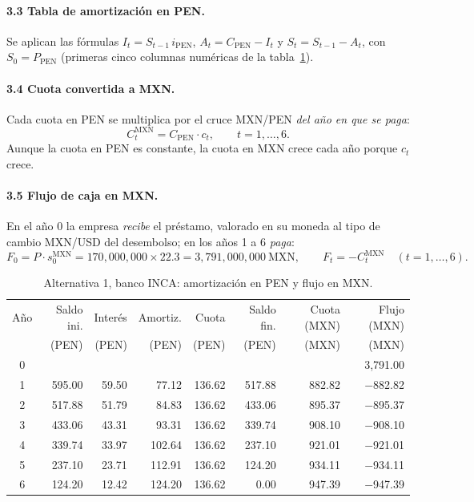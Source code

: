 \documentclass[11pt]{article}
\begin{document}
\paragraph{3.3 Tabla de amortizaci\'on en PEN.} Se aplican las f\'ormulas $I_t=S_{t-1}\,i_{\text{PEN}}$, $A_t=C_{\text{PEN}}-I_t$ y $S_t=S_{t-1}-A_t$, con $S_0=P_{\text{PEN}}$ (primeras cinco columnas num\'ericas de la tabla~\ref{tab:a1}).

\paragraph{3.4 Cuota convertida a MXN.} Cada cuota en PEN se multiplica por el cruce MXN/PEN \emph{del a\~no en que se paga}:
\[
C^{\text{MXN}}_t=C_{\text{PEN}}\cdot c_t,\qquad t=1,\dots,6 .
\]
Aunque la cuota en PEN es constante, la cuota en MXN crece cada a\~no porque $c_t$ crece.

\paragraph{3.5 Flujo de caja en MXN.} En el a\~no 0 la empresa \emph{recibe} el pr\'estamo, valorado en su moneda al tipo de cambio MXN/USD del desembolso; en los a\~nos 1 a 6 \emph{paga}:
\[
F_0=P\cdot s^{\text{MXN}}_0=170{,}000{,}000\times 22.3=3{,}791{,}000{,}000\ \text{MXN},\qquad
F_t=-C^{\text{MXN}}_t\quad(t=1,\dots,6).
\]

\begin{table}[H]\centering\small
\caption{Alternativa 1, banco INCA: amortizaci\'on en PEN y flujo en MXN.}\label{tab:a1}
\begin{tabular}{c r r r r r r r}\toprule
Año & Saldo ini. & Interés & Amortiz. & Cuota & Saldo fin. & Cuota (MXN) & Flujo (MXN)\\
& (PEN) & (PEN) & (PEN) & (PEN) & (PEN) & (MXN) & (MXN)\\\midrule
0 & & & & & & & 3{,}791.00\\
1 & 595.00 & 59.50 & 77.12 & 136.62 & 517.88 & 882.82 & $-$882.82\\
2 & 517.88 & 51.79 & 84.83 & 136.62 & 433.06 & 895.37 & $-$895.37\\
3 & 433.06 & 43.31 & 93.31 & 136.62 & 339.74 & 908.10 & $-$908.10\\
4 & 339.74 & 33.97 & 102.64 & 136.62 & 237.10 & 921.01 & $-$921.01\\
5 & 237.10 & 23.71 & 112.91 & 136.62 & 124.20 & 934.11 & $-$934.11\\
6 & 124.20 & 12.42 & 124.20 & 136.62 & 0.00 & 947.39 & $-$947.39\\
\bottomrule\end{tabular}
\par{}\end{table}
\end{document}
